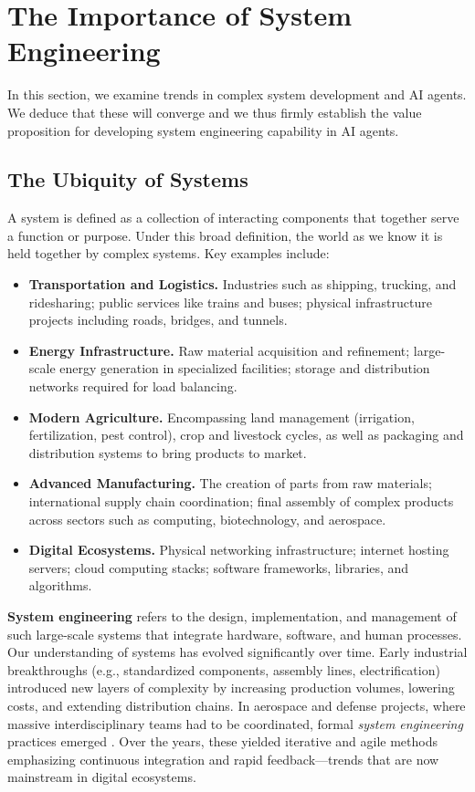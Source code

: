 \section{The Importance of System Engineering}

In this section, we examine trends in complex system development and AI agents. We deduce that these will converge and we thus firmly establish the value proposition for developing system engineering capability in AI agents.

\subsection{The Ubiquity of Systems}

A system is defined as a collection of interacting components that together serve a function or purpose. Under this broad definition, the world as we know it is held together by complex systems. Key examples include:
\begin{itemize}
    \item \textbf{Transportation and Logistics.} Industries such as shipping, trucking, and ridesharing; public services like trains and buses; physical infrastructure projects including roads, bridges, and tunnels.
    \item \textbf{Energy Infrastructure.} Raw material acquisition and refinement; large-scale energy generation in specialized facilities; storage and distribution networks required for load balancing.
    \item \textbf{Modern Agriculture.} Encompassing land management (irrigation, fertilization, pest control), crop and livestock cycles, as well as packaging and distribution systems to bring products to market.
    \item \textbf{Advanced Manufacturing.} The creation of parts from raw materials; international supply chain coordination; final assembly of complex products across sectors such as computing, biotechnology, and aerospace.
    \item \textbf{Digital Ecosystems.} Physical networking infrastructure; internet hosting servers; cloud computing stacks; software frameworks, libraries, and algorithms.
\end{itemize}

\textbf{System engineering} refers to the design, implementation, and management of such large-scale systems that integrate hardware, software, and human processes. Our understanding of systems has evolved significantly over time. Early industrial breakthroughs (e.g., standardized components, assembly lines, electrification) introduced new layers of complexity by increasing production volumes, lowering costs, and extending distribution chains. In aerospace and defense projects, where massive interdisciplinary teams had to be coordinated, formal \textit{system engineering} practices emerged \cite{blanchard2010, kossiakoff2011, incose2015, buede2016, madni2018}. Over the years, these yielded iterative and agile methods emphasizing continuous integration and rapid feedback—trends that are now mainstream in digital ecosystems. 

